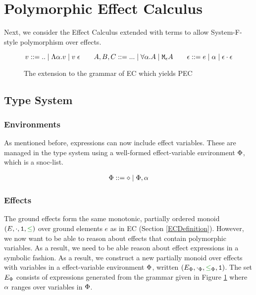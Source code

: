 \documentclass{Report}
\begin{document}
\section{Polymorphic Effect Calculus}

Next, we consider the Effect Calculus extended with terms to allow System-F-style polymorphism over effects.

\begin{figure}[H]
    \centering
    \begin{framed}
        
\[
    v::=\text{..}\mid\elam{\a}{v}\mid\eapp{v}{\e}
    \quad\quad
    A, B, C::=\text{...}\mid \all{\a}{A}\mid\mea
    \quad\quad
    \e ::= e \mid \a \mid \e\dot\e
\]
    \end{framed}
    \caption{The extension to the grammar of EC which yields PEC}
    \label{PECExtension}
\end{figure}

\subsection{Type System}
\subsubsection{Environments}
As mentioned before, expressions can now include effect variables. These are managed in the type system using a well-formed effect-variable environment $\P$, which is a snoc-list.

\begin{align*}
    \P ::= \nil \mid \P, \a
\end{align*}



\subsubsection{Effects}
The ground effects form the same monotonic, partially ordered monoid $(E, \dot, \1, \subeffect)$ over ground elements $e$ as in EC (Section \ref{ECDefinition}). However, we now want to be able to reason about effects that contain polymorphic variables. As a  result, we need to be able reason about effect expressions in a symbolic fashion. As a result, we construct a new partially monoid over effects with variables in a effect-variable environment $\P$, written $(E_\P, \dotp, \subeffectp, \1)$. The set $E_\P$ consists of expressions generated from the grammar given in Figure \ref{PECExtension} where $\a$ ranges over variables in $\P$.
\end{document}
